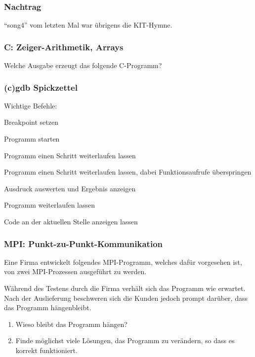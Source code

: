 \documentclass{beamer}
\date{2017-01-23/24}
\begin{document}
\normalsize
\normalem

\lstset{language=C}

\begin{frame}[plain]
  \titlepage
\end{frame}

\begin{frame}
  \frametitle{Nachtrag}
  “song4” vom letzten Mal war übrigens die KIT-Hymne.
\end{frame}

\begin{frame}
  \frametitle{C: Zeiger-Arithmetik, Arrays}
  Welche Ausgabe erzeugt das folgende C-Programm?
  
\end{frame}

\begin{frame}[fragile]
  \frametitle{(c)gdb Spickzettel}
  Wichtige Befehle:
  \begin{description}\let\realitem=\item \renewcommand{\item}[1][]{\realitem[\textbf#1]}
  \item[break] Breakpoint setzen
  \item[run] Programm starten
  \item[step] Programm einen Schritt weiterlaufen lassen
  \item[next] Programm einen Schritt weiterlaufen lassen,
    dabei Funktionsaufrufe überspringen
  \item[print] Ausdruck auswerten und Ergebnis anzeigen
  \item[continue] Programm weiterlaufen lassen
  \item[list] Code an der aktuellen Stelle anzeigen lassen
  \end{description}
\end{frame}

\begin{frame}[fragile]
  \frametitle{MPI: Punkt-zu-Punkt-Kommunikation}
  Eine Firma entwickelt folgendes MPI-Programm,
  welches dafür vorgesehen ist, von zwei MPI-Prozessen ausgeführt zu werden.

  Während des Testens durch die Firma verhält sich das Programm wie erwartet.
  Nach der Auslieferung beschweren sich die Kunden jedoch prompt darüber, dass das Programm hängenbleibt.

  \begin{enumerate}
  \item Wieso bleibt das Programm hängen?
  \item Finde möglichst viele Lösungen, das Programm zu verändern, so dass es korrekt funktioniert.
  \end{enumerate}
\end{frame}
\end{document}
